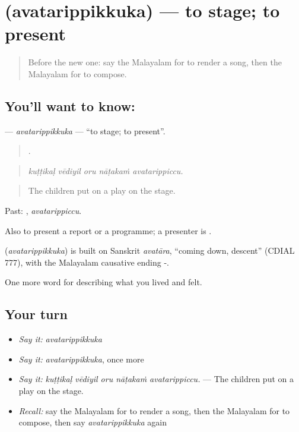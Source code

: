 \section[\texorpdfstring{\ml{അവതരിപ്പിക്കുക} (avatarippikkuka)}{അവതരിപ്പിക്കുക (avatarippikkuka)}]{ (avatarippikkuka) — to stage; to present}

\label{lesson:ML-C564-avatarippikkuka}



\begin{quote}
Before the new one: say the Malayalam for to render a song, then the Malayalam for to compose.
\end{quote}

\subsection*{You'll want to know: }
\textbf{} — \emph{avatarippikkuka} — \textquotedblleft{}to stage; to present\textquotedblright{}.

\begin{quote}
    .
\end{quote}

\begin{quote}
\emph{kuṭṭikaḷ vēdiyil oru nāṭakaṁ avatarippiccu.}
\end{quote}

\begin{quote}
The children put on a play on the stage.
\end{quote}

Past: , \emph{avatarippiccu}.

Also to present a report or a programme; a presenter is .

\begin{cousinweb}
\textbf{} (\emph{avatarippikkuka}) is built on Sanskrit \emph{avatāra}, \textquotedblleft{}coming down, descent\textquotedblright{} (CDIAL 777), with the Malayalam causative ending -.
\end{cousinweb}

\begin{grammarlens}[title={What you've built}]
One more word for describing what you lived and felt.
\end{grammarlens}

\subsection*{Your turn}
\begin{itemize}
\raggedright
  \item \emph{Say it:} \emph{avatarippikkuka}
  \item \emph{Say it:} \emph{avatarippikkuka}, once more
  \item \emph{Say it:} \emph{kuṭṭikaḷ vēdiyil oru nāṭakaṁ avatarippiccu.} — The children put on a play on the stage.
  \item \emph{Recall:} say the Malayalam for to render a song, then the Malayalam for to compose, then say \emph{avatarippikkuka} again
\end{itemize}

